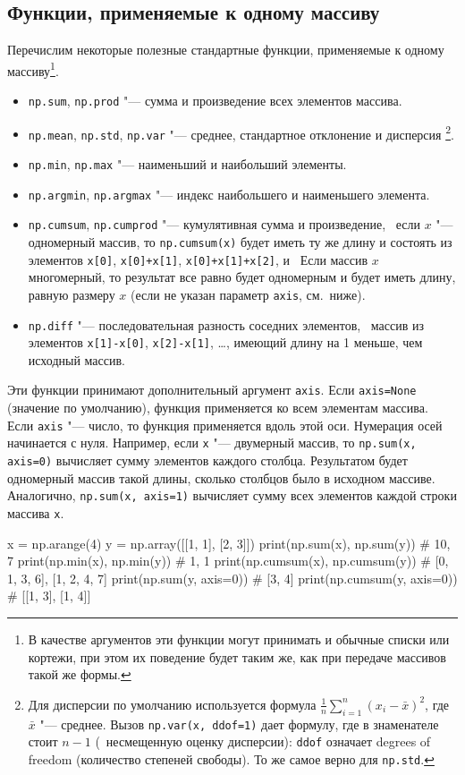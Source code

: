 \subsection{Функции, применяемые к одному массиву}
Перечислим некоторые полезные стандартные функции, применяемые к одному массиву\footnote{В качестве аргументов эти функции могут принимать и обычные списки или кортежи, при этом их поведение будет таким же, как при передаче массивов такой же формы.}.
\begin{itemize}
\item \verb"np.sum", \verb"np.prod" "--- сумма и произведение всех элементов массива.
\item \verb"np.mean", \verb"np.std", \verb"np.var" "--- среднее, стандартное отклонение и дисперсия%
\footnote{Для дисперсии по умолчанию  используется формула $\frac1n \sum_{i=1}^n (x_i-\bar x)^2$, где $\bar x$ "--- среднее. Вызов \verb"np.var(x, ddof=1)" дает формулу, где в знаменателе стоит $n-1$ (\te\ несмещенную оценку дисперсии): \verb"ddof" означает degrees of freedom (количество степеней свободы).
То же самое верно для \verb"np.std".}.
\item \verb"np.min", \verb"np.max" "--- наименьший и наибольший элементы.
\item \verb"np.argmin", \verb"np.argmax" "--- индекс наибольшего и наименьшего элемента.
\item \verb"np.cumsum", \verb"np.cumprod" "--- кумулятивная сумма и произведение, \te\ если $x$ "--- одномерный массив, то \verb"np.cumsum(x)" будет иметь ту же длину и состоять из элементов \verb"x[0]", \verb"x[0]+x[1]", \verb"x[0]+x[1]+x[2]", и \td\ 
Если массив $x$ многомерный, то результат все равно будет одномерным и будет иметь длину, равную размеру $x$ (если не указан параметр \verb"axis", см.~ниже).
\item \verb"np.diff" "--- последовательная разность соседних элементов, \te\ массив из элементов \verb"x[1]-x[0]", \verb"x[2]-x[1]", \ldots, имеющий длину на 1 меньше, чем исходный массив.
\end{itemize}

Эти функции принимают дополнительный аргумент \verb"axis".
Если \verb"axis=None" (значение по умолчанию), функция применяется ко всем элементам массива.
Если \verb"axis" "--- число, то функция применяется вдоль этой оси.
Нумерация осей начинается с нуля.
Например, если \verb"x" "--- двумерный массив, то \verb"np.sum(x, axis=0)" вычисляет сумму элементов каждого столбца.
Результатом будет одномерный массив такой длины, сколько столбцов было в исходном массиве.
Аналогично, \verb"np.sum(x, axis=1)" вычисляет сумму всех элементов каждой строки массива \verb"x". 
\begin{python}
x = np.arange(4)
y = np.array([[1, 1], [2, 3]])
print(np.sum(x), np.sum(y))                # 10, 7
print(np.min(x), np.min(y))                # 1, 1
print(np.cumsum(x), np.cumsum(y))          # [0, 1, 3, 6], [1, 2, 4, 7]
print(np.sum(y, axis=0))                   # [3, 4]
print(np.cumsum(y, axis=0))                # [[1, 3], [1, 4]]
\end{python}


